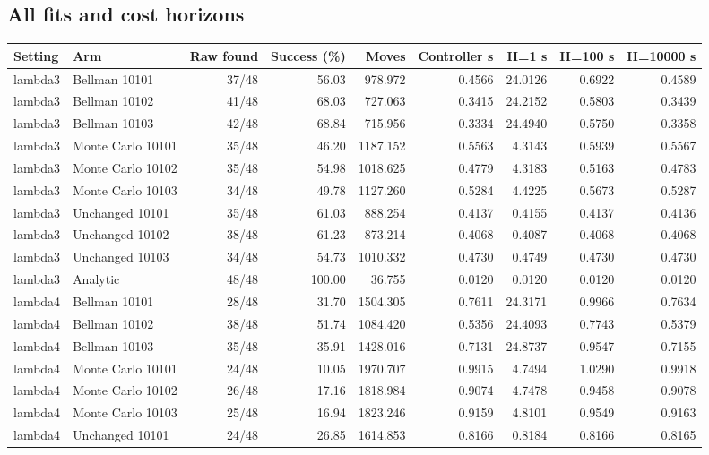 \documentclass[10pt]{article}
\begin{document}
\begin{landscape}\section{All fits and cost horizons}
{\small\centering
\begin{tabular}{llrrrrrrr}
\toprule
Setting & Arm & Raw found & Success (\%) & Moves & Controller s & H=1 s & H=100 s & H=10000 s \\ \midrule
lambda3 & Bellman 10101 & 37/48 & 56.03 & 978.972 & 0.4566 & 24.0126 & 0.6922 & 0.4589 \\
lambda3 & Bellman 10102 & 41/48 & 68.03 & 727.063 & 0.3415 & 24.2152 & 0.5803 & 0.3439 \\
lambda3 & Bellman 10103 & 42/48 & 68.84 & 715.956 & 0.3334 & 24.4940 & 0.5750 & 0.3358 \\
lambda3 & Monte Carlo 10101 & 35/48 & 46.20 & 1187.152 & 0.5563 & 4.3143 & 0.5939 & 0.5567 \\
lambda3 & Monte Carlo 10102 & 35/48 & 54.98 & 1018.625 & 0.4779 & 4.3183 & 0.5163 & 0.4783 \\
lambda3 & Monte Carlo 10103 & 34/48 & 49.78 & 1127.260 & 0.5284 & 4.4225 & 0.5673 & 0.5287 \\
lambda3 & Unchanged 10101 & 35/48 & 61.03 & 888.254 & 0.4137 & 0.4155 & 0.4137 & 0.4136 \\
lambda3 & Unchanged 10102 & 38/48 & 61.23 & 873.214 & 0.4068 & 0.4087 & 0.4068 & 0.4068 \\
lambda3 & Unchanged 10103 & 34/48 & 54.73 & 1010.332 & 0.4730 & 0.4749 & 0.4730 & 0.4730 \\
lambda3 & Analytic & 48/48 & 100.00 & 36.755 & 0.0120 & 0.0120 & 0.0120 & 0.0120 \\
lambda4 & Bellman 10101 & 28/48 & 31.70 & 1504.305 & 0.7611 & 24.3171 & 0.9966 & 0.7634 \\
lambda4 & Bellman 10102 & 38/48 & 51.74 & 1084.420 & 0.5356 & 24.4093 & 0.7743 & 0.5379 \\
lambda4 & Bellman 10103 & 35/48 & 35.91 & 1428.016 & 0.7131 & 24.8737 & 0.9547 & 0.7155 \\
lambda4 & Monte Carlo 10101 & 24/48 & 10.05 & 1970.707 & 0.9915 & 4.7494 & 1.0290 & 0.9918 \\
lambda4 & Monte Carlo 10102 & 26/48 & 17.16 & 1818.984 & 0.9074 & 4.7478 & 0.9458 & 0.9078 \\
lambda4 & Monte Carlo 10103 & 25/48 & 16.94 & 1823.246 & 0.9159 & 4.8101 & 0.9549 & 0.9163 \\
lambda4 & Unchanged 10101 & 24/48 & 26.85 & 1614.853 & 0.8166 & 0.8184 & 0.8166 & 0.8165 \\

\end{tabular}}
\end{landscape}
\end{document}
